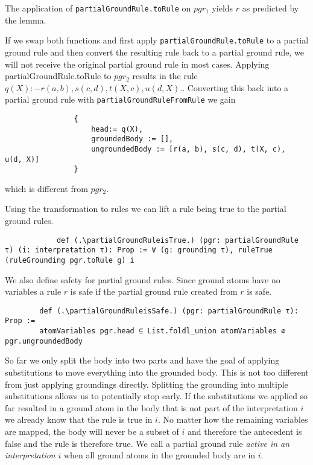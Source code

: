         \begin{example}
            The application of \texttt{partialGroundRule.toRule} on $pgr_1$ yields $r$ as predicted by the lemma.

            If we swap both functions and first apply \texttt{partialGroundRule.toRule} to a partial ground rule and then convert the resulting rule back to a partial ground rule, we will not receive the original partial ground rule in most cases. Applying {partialGroundRule.toRule} to $pgr_2$ results in the rule $ q(X) :- r(a, b), s(c, d), t(X, c),  u(d, X) . $. Converting this back into a partial ground rule with \texttt{partialGroundRuleFromRule} we gain 

            \begin{lstlisting}
                {
                    head:= q(X),
                    groundedBody := [],
                    ungroundedBody := [r(a, b), s(c, d), t(X, c),  u(d, X)]
                }
            \end{lstlisting}
            which is different from $pgr_2$.
        \end{example}

        Using the transformation to rules we can lift a rule being true to the partial ground rules.

        \begin{lstlisting}
            def (.\partialGroundRuleisTrue.) (pgr: partialGroundRule τ) (i: interpretation τ): Prop := ∀ (g: grounding τ), ruleTrue (ruleGrounding pgr.toRule g) i
        \end{lstlisting}

        We also define safety for partial ground rules. Since ground atoms have no variables a rule $r$ is safe if the partial ground rule created from $r$ is safe.

        \begin{lstlisting}     
        def (.\partialGroundRuleisSafe.) (pgr: partialGroundRule τ): Prop :=
        atomVariables pgr.head ⊆ List.foldl_union atomVariables ∅ pgr.ungroundedBody
        \end{lstlisting}

        So far we only split the body into two parts and have the goal of applying substitutions to move everything into the grounded body. This is not too different from just applying groundings directly. 
        Splitting the grounding into multiple substitutions allows us to potentially stop early. If the substitutions we applied so far resulted in a ground atom in the body that is not part of the interpretation $i$ we already know that the rule is true in $i$. No matter how the remaining variables are mapped, the body will never be a subset of $i$ and therefore the antecedent is false and the rule is therefore true. We call a partial ground rule \textit{active in an interpretation} $i$ when all ground atoms in the grounded body are in $i$.

